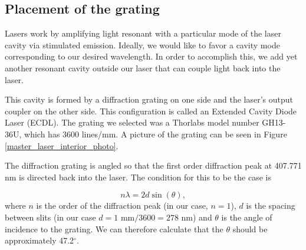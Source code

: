 

\subsection{Placement of the grating}



Lasers work by amplifying light resonant with a particular mode of the laser cavity via stimulated emission. Ideally, we would like to favor a cavity mode corresponding to our desired wavelength. In order to accomplish this, we add yet another resonant cavity outside our laser that can couple light back into the laser. 

This cavity is formed by a diffraction grating on one side and the laser's output coupler on the other side. This configuration is called an Extended Cavity Diode Laser (ECDL). The grating we selected was a Thorlabs model number GH13-36U, which has 3600 lines/mm. A picture of the grating can be seen in Figure\,\ref{master_laser_interior_photo}. 

The diffraction grating is angled so that the first order diffraction peak at 407.771 nm is directed back into the laser. The condition for this to be the case is 

\begin{equation} \label{gratingEQn}
n \lambda = 2 d \sin (\theta),
\end{equation}
where $n$ is the order of the diffraction peak (in our case, $n=1$), $d$ is the spacing between slits (in our case $d=1$ mm$/3600 = 278 $ nm) and $\theta$ is the angle of incidence to the grating. We can therefore calculate that the $\theta$ should be approximately 47.2$^\circ$.

